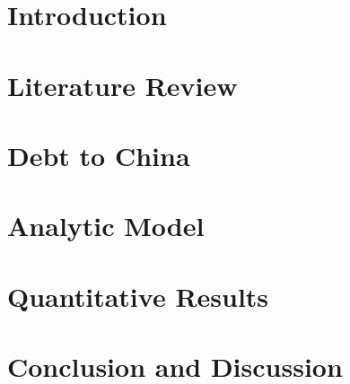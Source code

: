 \documentclass{ntuthesis}
\newcommand{\withdoi}{1}
\theoremstyle{definition}
\def\withwatermark{1}
\begin{document}
\frontmatter

\makecover

\ifdefined\excludefirstpage

  \def\withwatermark{1}
  \ifdefined\withwatermark
    \newsavebox\mybox
    \savebox{}
    \newwatermark[allpages,xpos=6.1725cm,ypos=10.5225cm,scale=0.5]{\usebox\mybox}
  \fi

  \ifdefined\withdoi
    \insertdoi
  \fi
\fi

\makecertification




\tableofcontents
\listoffigures
\listoftables

\mainmatter


\chapter{Introduction}
  \label{ch:intro}
\chapter{Literature Review} \label{ch:lit}

\chapter{Debt to China} \label{ch:data}

\chapter{Analytic Model} \label{ch:model}

\chapter{Quantitative Results}  \label{ch:result}

\chapter{Conclusion and Discussion} \label{ch:conclusion}




{}
{}



\end{document}
